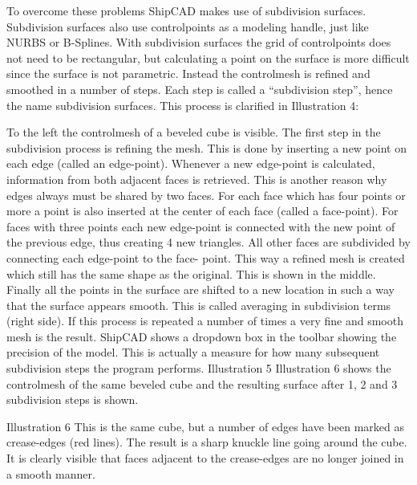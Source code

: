 \documentclass[12pt]{article}
\begin{document}
To overcome these problems ShipCAD makes use of subdivision surfaces. Subdivision surfaces
also use controlpoints as a modeling handle, just like NURBS or B-Splines. With subdivision
surfaces the grid of controlpoints does not need to be rectangular, but calculating a point on the
surface is more difficult since the surface is not parametric. Instead the controlmesh is refined and
smoothed in a number of steps. Each step is called a “subdivision step”, hence the name
subdivision surfaces. This process is clarified in Illustration 4:

To the left the controlmesh of a beveled cube is visible. The first step in the subdivision process is
refining the mesh. This is done by inserting a new point on each edge (called an edge-point).
Whenever a new edge-point is calculated, information from both adjacent faces is retrieved. This is
another reason why edges always must be shared by two faces. For each face which has four
points or more a point is also inserted at the center of each face (called a face-point). For faces with
three points each new edge-point is connected with the new point of the previous edge, thus
creating 4 new triangles. All other faces are subdivided by connecting each edge-point to the face-
point. This way a refined mesh is created which still has the same shape as the original. This is
shown in the middle. Finally all the points in the surface are shifted to a new location in such a way
that the surface appears smooth. This is called averaging in subdivision terms (right side). If this
process is repeated a number of times a very fine and smooth
mesh is the result. ShipCAD shows a dropdown box in the toolbar showing the precision of the
model. This is actually a measure for how many subsequent subdivision steps the program
performs.
Illustration 5
Illustration 6 shows the controlmesh of the same beveled cube and the resulting surface after 1, 2
and 3 subdivision steps is shown.

Illustration 6
This is the same cube, but a number of edges have been marked as crease-edges (red lines). The
result is a sharp knuckle line going around the cube. It is clearly visible that faces adjacent to the
crease-edges are no longer joined in a smooth manner.
\end{document}
